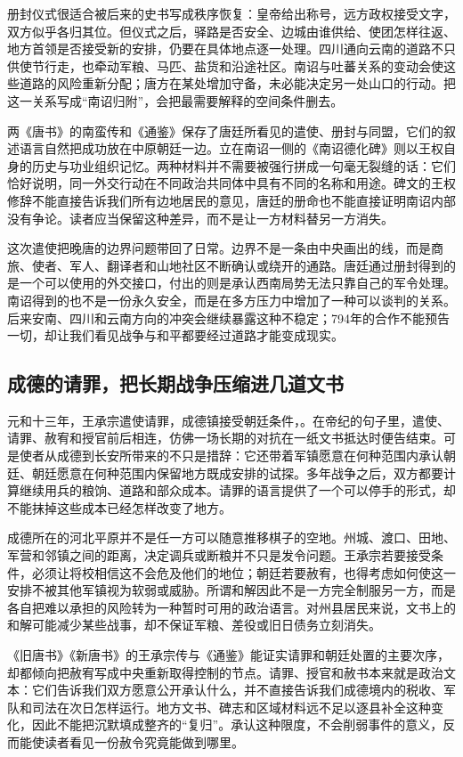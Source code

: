 册封仪式很适合被后来的史书写成秩序恢复：皇帝给出称号，远方政权接受文字，双方似乎各归其位。但仪式之后，驿路是否安全、边城由谁供给、使团怎样往返、地方首领是否接受新的安排，仍要在具体地点逐一处理。四川通向云南的道路不只供使节行走，也牵动军粮、马匹、盐货和沿途社区。南诏与吐蕃关系的变动会使这些道路的风险重新分配；唐方在某处增加守备，未必能决定另一处山口的行动。把这一关系写成“南诏归附”，会把最需要解释的空间条件删去。

两《唐书》的南蛮传和《通鉴》保存了唐廷所看见的遣使、册封与同盟，它们的叙述语言自然把成功放在中原朝廷一边。立在南诏一侧的《南诏德化碑》则以王权自身的历史与功业组织记忆。两种材料并不需要被强行拼成一句毫无裂缝的话：它们恰好说明，同一外交行动在不同政治共同体中具有不同的名称和用途。碑文的王权修辞不能直接告诉我们所有边地居民的意见，唐廷的册命也不能直接证明南诏内部没有争论。读者应当保留这种差异，而不是让一方材料替另一方消失。

这次遣使把晚唐的边界问题带回了日常。边界不是一条由中央画出的线，而是商旅、使者、军人、翻译者和山地社区不断确认或绕开的通路。唐廷通过册封得到的是一个可以使用的外交接口，付出的则是承认西南局势无法只靠自己的军令处理。南诏得到的也不是一份永久安全，而是在多方压力中增加了一种可以谈判的关系。后来安南、四川和云南方向的冲突会继续暴露这种不稳定；794年的合作不能预告一切，却让我们看见战争与和平都要经过道路才能变成现实。

\subsection{成德的请罪，把长期战争压缩进几道文书}
元和十三年，王承宗遣使请罪，成德镇接受朝廷条件，。在帝纪的句子里，遣使、请罪、赦宥和授官前后相连，仿佛一场长期的对抗在一纸文书抵达时便告结束。可是使者从成德到长安所带来的不只是措辞：它还带着军镇愿意在何种范围内承认朝廷、朝廷愿意在何种范围内保留地方既成安排的试探。多年战争之后，双方都要计算继续用兵的粮饷、道路和部众成本。请罪的语言提供了一个可以停手的形式，却不能抹掉这些成本已经怎样改变了地方。

成德所在的河北平原并不是任一方可以随意推移棋子的空地。州城、渡口、田地、军营和邻镇之间的距离，决定调兵或断粮并不只是发令问题。王承宗若要接受条件，必须让将校相信这不会危及他们的地位；朝廷若要赦宥，也得考虑如何使这一安排不被其他军镇视为软弱或威胁。所谓和解因此不是一方完全制服另一方，而是各自把难以承担的风险转为一种暂时可用的政治语言。对州县居民来说，文书上的和解可能减少某些战事，却不保证军粮、差役或旧日债务立刻消失。

《旧唐书》《新唐书》的王承宗传与《通鉴》能证实请罪和朝廷处置的主要次序，却都倾向把赦宥写成中央重新取得控制的节点。请罪、授官和赦书本来就是政治文本：它们告诉我们双方愿意公开承认什么，并不直接告诉我们成德境内的税收、军队和司法在次日怎样运行。地方文书、碑志和区域材料远不足以逐县补全这种变化，因此不能把沉默填成整齐的“复归”。承认这种限度，不会削弱事件的意义，反而能使读者看见一份赦令究竟能做到哪里。

